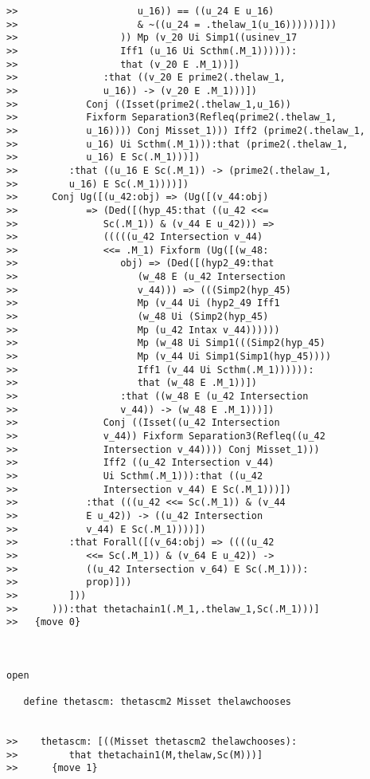 \documentclass[12pt]{article}
\begin{document}
\begin{verbatim}
>>                     u_16)) == ((u_24 E u_16)
>>                     & ~((u_24 = .thelaw_1(u_16))))))]))
>>                  )) Mp (v_20 Ui Simp1((usinev_17
>>                  Iff1 (u_16 Ui Scthm(.M_1)))))):
>>                  that (v_20 E .M_1))])
>>               :that ((v_20 E prime2(.thelaw_1,
>>               u_16)) -> (v_20 E .M_1)))])
>>            Conj ((Isset(prime2(.thelaw_1,u_16))
>>            Fixform Separation3(Refleq(prime2(.thelaw_1,
>>            u_16)))) Conj Misset_1))) Iff2 (prime2(.thelaw_1,
>>            u_16) Ui Scthm(.M_1))):that (prime2(.thelaw_1,
>>            u_16) E Sc(.M_1)))])
>>         :that ((u_16 E Sc(.M_1)) -> (prime2(.thelaw_1,
>>         u_16) E Sc(.M_1))))])
>>      Conj Ug([(u_42:obj) => (Ug([(v_44:obj)
>>            => (Ded([(hyp_45:that ((u_42 <<=
>>               Sc(.M_1)) & (v_44 E u_42))) =>
>>               (((((u_42 Intersection v_44)
>>               <<= .M_1) Fixform (Ug([(w_48:
>>                  obj) => (Ded([(hyp2_49:that
>>                     (w_48 E (u_42 Intersection
>>                     v_44))) => (((Simp2(hyp_45)
>>                     Mp (v_44 Ui (hyp2_49 Iff1
>>                     (w_48 Ui (Simp2(hyp_45)
>>                     Mp (u_42 Intax v_44))))))
>>                     Mp (w_48 Ui Simp1(((Simp2(hyp_45)
>>                     Mp (v_44 Ui Simp1(Simp1(hyp_45))))
>>                     Iff1 (v_44 Ui Scthm(.M_1)))))):
>>                     that (w_48 E .M_1))])
>>                  :that ((w_48 E (u_42 Intersection
>>                  v_44)) -> (w_48 E .M_1)))])
>>               Conj ((Isset((u_42 Intersection
>>               v_44)) Fixform Separation3(Refleq((u_42
>>               Intersection v_44)))) Conj Misset_1)))
>>               Iff2 ((u_42 Intersection v_44)
>>               Ui Scthm(.M_1))):that ((u_42
>>               Intersection v_44) E Sc(.M_1)))])
>>            :that (((u_42 <<= Sc(.M_1)) & (v_44
>>            E u_42)) -> ((u_42 Intersection
>>            v_44) E Sc(.M_1))))])
>>         :that Forall([(v_64:obj) => ((((u_42
>>            <<= Sc(.M_1)) & (v_64 E u_42)) ->
>>            ((u_42 Intersection v_64) E Sc(.M_1))):
>>            prop)]))
>>         ]))
>>      ))):that thetachain1(.M_1,.thelaw_1,Sc(.M_1)))]
>>   {move 0}



open

   define thetascm: thetascm2 Misset thelawchooses


>>    thetascm: [((Misset thetascm2 thelawchooses):
>>         that thetachain1(M,thelaw,Sc(M)))]
>>      {move 1}


\end{verbatim}
\end{document}
